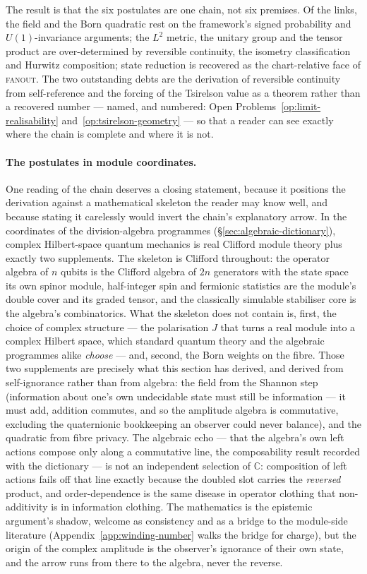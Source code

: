 \medskip
\noindent The result is that the six postulates are one chain, not six premises.
Of the links, the field and the Born quadratic rest on the framework's signed
probability and $U(1)$-invariance arguments; the $L^{2}$ metric, the unitary group
and the tensor product are over-determined by reversible continuity, the isometry
classification and Hurwitz composition; state reduction is recovered as the
chart-relative face of \textsc{fanout}. The two outstanding debts are the
derivation of reversible continuity from self-reference and the forcing of the Tsirelson value as
a theorem rather than a recovered number --- named, and numbered:
Open Problems~\ref{op:limit-realisability} and~\ref{op:tsirelson-geometry} --- so that a reader
can see exactly where the chain is complete and where it is not.

\paragraph{The postulates in module coordinates.}
One reading of the chain deserves a closing statement, because it positions the derivation
against a mathematical skeleton the reader may know well, and because stating it carelessly would
invert the chain's explanatory arrow. In the coordinates of the division-algebra programmes
(\S\ref{sec:algebraic-dictionary}), complex Hilbert-space quantum mechanics is real Clifford
module theory plus exactly two supplements. The skeleton is Clifford throughout: the operator
algebra of $n$ qubits is the Clifford algebra of $2n$ generators with the state space its own
spinor module, half-integer spin and fermionic statistics are the module's double cover and its
graded tensor, and the classically simulable stabiliser core is the algebra's combinatorics. What
the skeleton does not contain is, first, the choice of complex structure --- the polarisation $J$
that turns a real module into a complex Hilbert space, which standard quantum theory and the
algebraic programmes alike \emph{choose} --- and, second, the Born weights on the fibre. Those two
supplements are precisely what this section has derived, and derived from self-ignorance rather
than from algebra: the field from the Shannon step (information about one's own undecidable state
must still be information --- it must add, addition commutes, and so the amplitude algebra is
commutative, excluding the quaternionic bookkeeping an observer could never balance), and the
quadratic from fibre privacy. The algebraic echo --- that the algebra's own left actions compose
only along a commutative line, the composability result recorded with the dictionary --- is not
an independent selection of $\mathbb{C}$: composition of left actions fails off that line exactly
because the doubled slot carries the \emph{reversed} product, and order-dependence is the same
disease in operator clothing that non-additivity is in information clothing. The mathematics is
the epistemic argument's shadow, welcome as consistency and as a bridge to the module-side
literature (Appendix~\ref{app:winding-number} walks the bridge for charge), but the origin of the
complex amplitude is the observer's ignorance of their own state, and the arrow runs from there
to the algebra, never the reverse.